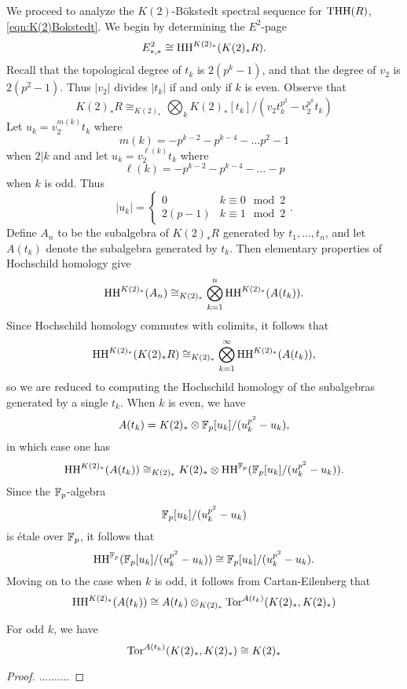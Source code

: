 We proceed to analyze the $K(2)$-B\"okstedt spectral sequence for $\operatorname{THH}(R)$, \eqref{eqn:K(2)Bokstedt}. We begin by determining the $E^2$-page
\[
E^2_{*,*}\cong \operatorname{HH}^{K(2)_*}(K(2)_*R).
\]
Recall that the topological degree of $t_k$ is $2(p^k-1)$, and that the degree of $v_2$ is $2(p^2-1)$. Thus $|v_2|$ divides $|t_k|$ if and only if $k$ is even. Observe that 
\[
K(2)_*R\cong_{K(2)_*}\bigotimes_k K(2)_*[t_k]/(v_2t_k^{p^2}-v_2^{p^k}t_k)
\] 
Let $u_k=v_2^{m(k)}t_k$ where 
\[
m(k)=-p^{k-2}-p^{k-4} - \dots p^2-1
\] 
when $2|k$ and and let $u_k=v_2^{\ell(k)}t_k$ where 
\[
\ell(k)=-p^{k-2}-p^{k-4} -\dots -p
\] 
when $k$ is odd. Thus 
\[
|u_k|= 
\begin{cases}
	0 & k\equiv 0 \mod 2\\
	2(p-1) & k\equiv 1 \mod 2
\end{cases}.
\]
Define $A_n$ to be the subalgebra of $K(2)_*R$ generated by $t_1, \ldots , t_n$, and let $A(t_k)$ denote the subalgebra generated by $t_k$. Then elementary properties of Hochschild homology give
\[
\operatorname{HH}^{K(2)_*}(A_n)\cong_{K(2)_*}\bigotimes_{k=1}^n\operatorname{HH}^{K(2)_*}(A(t_k)).
\]
Since Hochschild homology commutes with colimits, it follows that 
\[
\operatorname{HH}^{K(2)_*}(K(2)_*R)\cong_{K(2)_*}\bigotimes_{k=1}^\infty \operatorname{HH}^{K(2)_*}(A(t_k)),
\]
so we are reduced to computing the Hochschild homology of the subalgebras generated by a single $t_k$. When $k$ is even, we have 
\[
A(t_k)= K(2)_*\otimes \mathbb{F}_p[u_k]/(u_k^{p^2}-u_k),
\]
in which case one has 
\[
\operatorname{HH}^{K(2)_*}(A(t_k))\cong_{K(2)_*}K(2)_*\otimes \operatorname{HH}^{\mathbb{F}_p}(\mathbb{F}_p[u_k]/(u_k^{p^2}-u_k)).
\]
Since the $\mathbb{F}_p$-algebra
\[
\mathbb{F}_p[u_k]/(u_k^{p^2}-u_k)
\]
is \'etale over $\mathbb{F}_p$, it follows that  
\[
\operatorname{HH}^{\mathbb{F}_p}(\mathbb{F}_p[u_k]/(u_k^{p^2}-u_k))\cong \mathbb{F}_p[u_k]/(u_k^{p^2}-u_k).
\]
Moving on to the case when $k$ is odd, it follows from Cartan-Eilenberg  that 
\[
\operatorname{HH}^{K(2)_*}(A(t_k))\cong A(t_k)\otimes_{K(2)_*} \operatorname{Tor}^{A(t_k)}(K(2)_*, K(2)_*)
\]

\begin{lem}
	For odd $k$, we have 
	\[
	\operatorname{Tor}^{A(t_k)}(K(2)_*, K(2)_*)\cong K(2)_*
	\]
\end{lem}
\begin{proof}
	..........
\end{proof}

